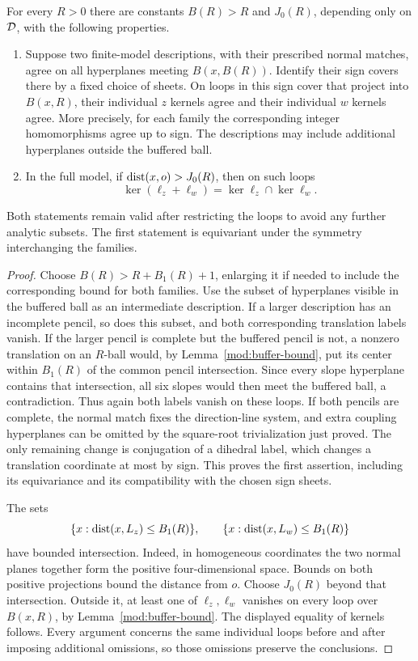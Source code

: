 \begin{proposition}\label{prop:kernel-compatibility}
For every $R>0$ there are constants $B(R)>R$ and $J_0(R)$, depending
only on $\mathcal D$, with the following properties.
\begin{enumerate}
\item Suppose two finite-model descriptions, with their prescribed
normal matches, agree on all hyperplanes meeting $B(x,B(R))$.
Identify their sign covers there by a fixed choice of sheets.
On loops in this sign cover that project into $B(x,R)$, their
individual $z$ kernels agree and their individual $w$ kernels
agree.  More precisely, for each family the corresponding integer
homomorphisms agree up to sign.
The descriptions may include additional hyperplanes outside the
buffered ball.
\item In the full model, if $\operatorname{dist}(x,o)>J_0(R)$, then on such loops
\[
 \ker(\ell_z+\ell_w)=\ker\ell_z\cap\ker\ell_w.
\]
\end{enumerate}
Both statements remain valid after restricting the loops to avoid
any further analytic subsets.  The first statement is equivariant
under the symmetry interchanging the families.
\end{proposition}
\begin{proof}
Choose $B(R)>R+B_1(R)+1$, enlarging it if needed to include the
corresponding bound for both families.  Use the subset of hyperplanes
visible in the buffered ball as an intermediate description.
If a larger description has an incomplete pencil, so does this
subset, and both corresponding translation labels vanish.
If the larger pencil is complete but the buffered pencil is not,
a nonzero translation on an $R$-ball would, by
Lemma~\ref{mod:buffer-bound}, put its center within $B_1(R)$ of the
common pencil intersection.  Since every slope hyperplane contains
that intersection, all six slopes would then meet the buffered
ball, a contradiction.  Thus again both labels vanish on these
loops.  If both pencils are complete, the normal match fixes the
direction-line system, and extra coupling hyperplanes can be
omitted by the square-root trivialization just proved.  The only
remaining change is conjugation of a dihedral label, which changes
a translation coordinate at most by sign.  This proves the first
assertion, including its equivariance and its compatibility with
the chosen sign sheets.

The sets
\[
 \{x:\operatorname{dist}(x,L_z)\le B_1(R)\},\qquad
 \{x:\operatorname{dist}(x,L_w)\le B_1(R)\}
\]
have bounded intersection.  Indeed, in homogeneous coordinates
the two normal planes together form the positive four-dimensional
space.  Bounds on both positive projections bound the distance
from $o$.  Choose $J_0(R)$ beyond that intersection.  Outside it,
at least one of $\ell_z,\ell_w$ vanishes on every loop over
$B(x,R)$, by Lemma~\ref{mod:buffer-bound}.  The displayed equality
of kernels follows.  Every argument concerns the same individual
loops before and after imposing additional omissions, so those
omissions preserve the conclusions.
\end{proof}

